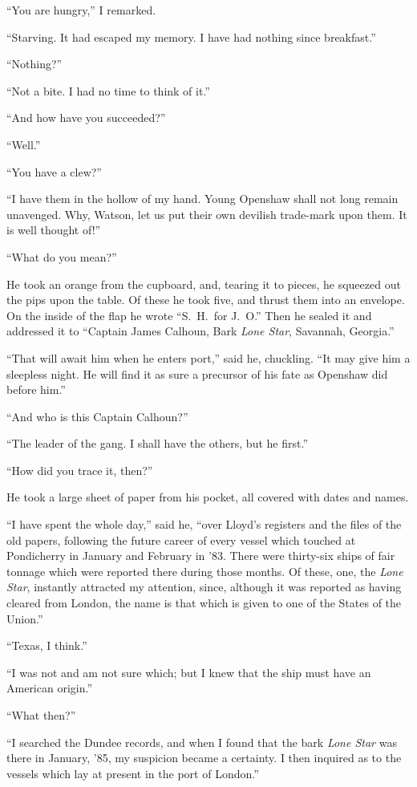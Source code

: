 “You are hungry,” I remarked.

“Starving. It had escaped my memory. I have had nothing
since breakfast.”

“Nothing?”

“Not a bite. I had no time to think of it.”

“And how have you succeeded?”

“Well.”

“You have a clew?”

“I have them in the hollow of my hand. Young Openshaw
shall not long remain unavenged. Why, Watson, let us put
their own devilish trade-mark upon them. It is well thought
of!”

“What do you mean?”

He took an orange from the cupboard, and, tearing it to
pieces, he squeezed out the pips upon the table. Of these he
took five, and thrust them into an envelope. On the inside of
the flap he wrote “S.\ H.\ for J.\ O.” Then he sealed it and
addressed it to “Captain James Calhoun, Bark \textit{Lone Star},
Savannah, Georgia.”

“That will await him when he enters port,” said he, chuckling.
“It may give him a sleepless night. He will find it as
sure a precursor of his fate as Openshaw did before him.”

“And who is this Captain Calhoun?”

“The leader of the gang. I shall have the others, but he
first.”

“How did you trace it, then?”

He took a large sheet of paper from his pocket, all covered
with dates and names.

“I have spent the whole day,” said he, “over Lloyd’s registers
and the files of the old papers, following the future career
of every vessel which touched at Pondicherry in January
and February in ’83. There were thirty-six ships of fair tonnage
which were reported there during those months. Of
these, one, the \textit{Lone Star}, instantly attracted my attention,
since, although it was reported as having cleared from London,
the name is that which is given to one of the States of
the Union.”

“Texas, I think.”

“I was not and am not sure which; but I knew that the
ship must have an American origin.”

“What then?”

“I searched the Dundee records, and when I found that the
bark \textit{Lone Star} was there in January, ’85, my suspicion became
a certainty. I then inquired as to the vessels which lay at
present in the port of London.”

